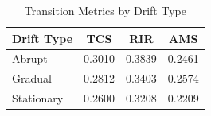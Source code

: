 \begin{table}[htbp]
\centering
\caption{Transition Metrics by Drift Type}
\label{tab:transition_metrics}
\begin{tabular}{lccc}
\toprule
Drift Type & TCS & RIR & AMS \\
\midrule
Abrupt & 0.3010 & 0.3839 & 0.2461 \\
Gradual & 0.2812 & 0.3403 & 0.2574 \\
Stationary & 0.2600 & 0.3208 & 0.2209 \\
\bottomrule
\end{tabular}
\end{table}